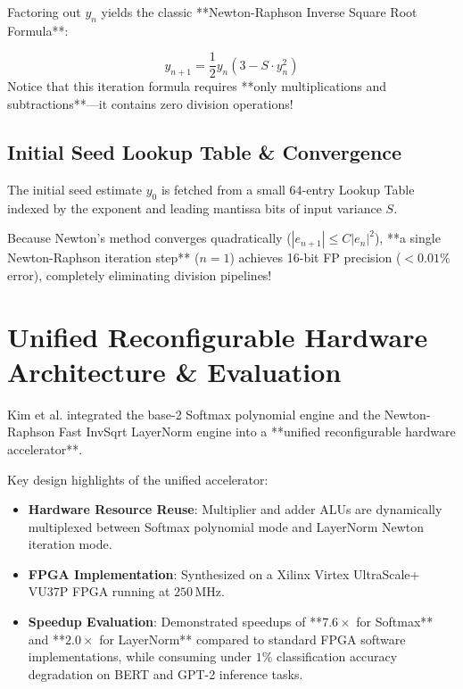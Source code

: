 Factoring out $y_n$ yields the classic **Newton-Raphson Inverse Square Root Formula**:

\begin{mathbox}
\begin{equation}
y_{n+1} = \frac{1}{2} y_n \left( 3 - S \cdot y_n^2 \right)
\end{equation}
Notice that this iteration formula requires **only multiplications and subtractions**---it contains zero division operations!
\end{mathbox}

\subsection{Initial Seed Lookup Table \& Convergence}
The initial seed estimate $y_0$ is fetched from a small $64$-entry Lookup Table indexed by the exponent and leading mantissa bits of input variance $S$.

Because Newton's method converges quadratically ($|e_{n+1}| \le C |e_n|^2$), **a single Newton-Raphson iteration step** ($n=1$) achieves 16-bit FP precision ($<0.01\%$ error), completely eliminating division pipelines!


\section{Unified Reconfigurable Hardware Architecture \& Evaluation}
Kim et al. integrated the base-2 Softmax polynomial engine and the Newton-Raphson Fast InvSqrt LayerNorm engine into a **unified reconfigurable hardware accelerator**.

Key design highlights of the unified accelerator:
\begin{itemize}[leftmargin=*]
    \item \textbf{Hardware Resource Reuse}: Multiplier and adder ALUs are dynamically multiplexed between Softmax polynomial mode and LayerNorm Newton iteration mode.
    \item \textbf{FPGA Implementation}: Synthesized on a Xilinx Virtex UltraScale+ VU37P FPGA running at $250\,\text{MHz}$.
    \item \textbf{Speedup Evaluation}: Demonstrated speedups of **$7.6\times$ for Softmax** and **$2.0\times$ for LayerNorm** compared to standard FPGA software implementations, while consuming under $1\%$ classification accuracy degradation on BERT and GPT-2 inference tasks.
\end{itemize}
